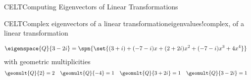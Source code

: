 \begin{subsect}{CELT}{Computing Eigenvectors of Linear Transformations}
\begin{example}{CELT}{Complex eigenvectors of a linear transformation}{eigenvalues!complex, of a linear transformation}
\begin{para}
\begin{align*}
%
\eigenspace{Q}{3-2i}&=\spn{\set{(3+i)+(-7-i)x+(2+2i)x^2+(-7-i)x^3+4x^4}}
%
\end{align*}
%
with geometric multiplicities
%
%
\begin{align*}
\geomult{Q}{2}&=2
&
\geomult{Q}{-4}&=1
&
\geomult{Q}{3+2i}&=1
&
\geomult{Q}{3-2i}&=1
\end{align*}
\end{para}
%
\end{example}
%
%
%
\end{subsect}
%
